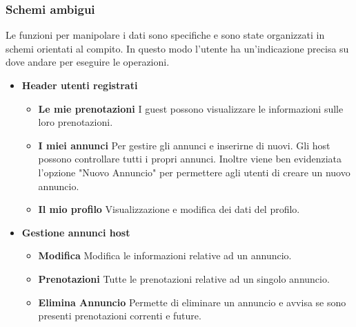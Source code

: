 \documentclass[1_relazione.tex]{subfiles}
\begin{document}
\subsubsection{Schemi ambigui}
Le funzioni per manipolare i dati sono specifiche e sono state organizzati in schemi orientati al compito. In questo modo l'utente ha un'indicazione precisa su dove andare per eseguire le operazioni.

\begin{itemize}
\item \textbf{Header utenti registrati}
\begin{itemize}
\item \textbf{Le mie prenotazioni} I guest possono visualizzare le informazioni sulle loro prenotazioni.
\item \textbf{I miei annunci} Per gestire gli annunci e inserirne di nuovi. Gli host possono controllare tutti i propri annunci. Inoltre viene ben evidenziata l'opzione "Nuovo Annuncio" per permettere agli utenti di creare un nuovo annuncio.
\item \textbf{Il mio profilo} Visualizzazione e modifica dei dati del profilo. 
\end{itemize}

\item \textbf{Gestione annunci host}
\begin{itemize}
\item \textbf{Modifica} Modifica le informazioni relative ad un annuncio.
\item \textbf{Prenotazioni} Tutte le prenotazioni relative ad un singolo annuncio.
\item \textbf{Elimina Annuncio} Permette di eliminare un annuncio e avvisa se sono presenti prenotazioni correnti e future.
\end{itemize}
\end{itemize}
\end{document}
